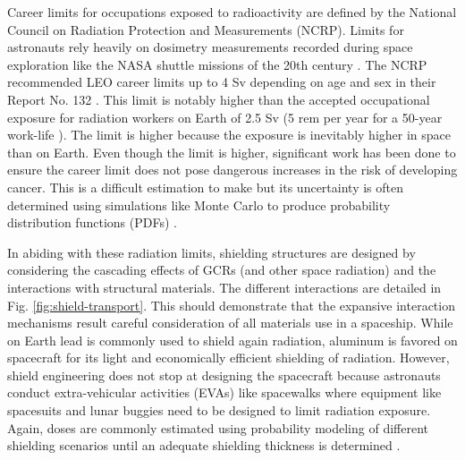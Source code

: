 Career limits for occupations exposed to radioactivity are defined by the National Council on Radiation Protection and Measurements (NCRP). Limits for astronauts rely heavily on dosimetry measurements recorded during space exploration like the NASA shuttle missions of the 20th century \cite{cucinotta-shuttle}. The NCRP recommended LEO career limits up to 4 Sv depending on age and sex in their Report No. 132 \cite{ncrp-132}. This limit is notably higher than the accepted occupational exposure for radiation workers on Earth of 2.5 Sv (5 rem per year for a 50-year work-life \cite{lamarsh}). The limit is higher because the exposure is inevitably higher in space than on Earth. Even though the limit is higher, significant work has been done to ensure the career limit does not pose dangerous increases in the risk of developing cancer. This is a difficult estimation to make but its uncertainty is often determined using simulations like Monte Carlo to produce probability distribution functions (PDFs) \cite{cucinotta-pdf}.

In abiding with these radiation limits, shielding structures are designed by considering the cascading effects of GCRs (and other space radiation) and the interactions with structural materials. The different interactions are detailed in Fig. \ref{fig:shield-transport}. This should demonstrate that the expansive interaction mechanisms result careful consideration of all materials use in a spaceship. While on Earth lead is commonly used to shield again radiation, aluminum is favored on spacecraft for its light and economically efficient shielding of radiation. However, shield engineering does not stop at designing the spacecraft because astronauts conduct extra-vehicular activities (EVAs) like spacewalks where equipment like spacesuits and lunar buggies need to be designed to limit radiation exposure. Again, doses are commonly estimated using probability modeling of different shielding scenarios until an adequate shielding thickness is determined \cite{eva-model}.

